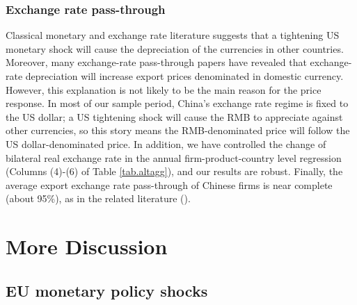 \subsubsection{Exchange rate pass-through}
 
Classical monetary and exchange rate literature suggests that a tightening US monetary shock will cause the depreciation of the currencies in other countries. Moreover, many exchange-rate pass-through papers have revealed that exchange-rate depreciation will increase export prices denominated in domestic currency. However, this explanation is not likely to be the main reason for the price response. In most of our sample period, China's exchange rate regime is fixed to the US dollar; a US tightening shock will cause the RMB to appreciate against other currencies, so this story means the RMB-denominated price will follow the US dollar-denominated price. In addition, we have controlled the change of bilateral real exchange rate in the annual firm-product-country level regression (Columns (4)-(6) of Table \ref{tab.altagg}), and our results are robust. Finally, the average export exchange rate pass-through of Chinese firms is near complete (about 95\%), as in the related literature (\cite{li2015exchange}).

 
\newpage
\section{More Discussion}

\subsection{EU monetary policy shocks}

